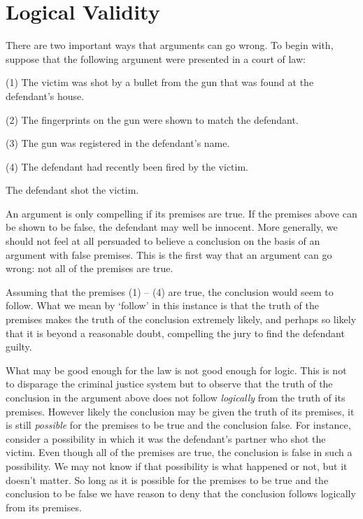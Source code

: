 \section{Logical Validity}

There are two important ways that arguments can go wrong.
To begin with, suppose that the following argument were presented in a court of law:

\begin{earg}
  \item[(1)] The victim was shot by a bullet from the gun that was found at the defendant's house.
  \item[(2)] The fingerprints on the gun were shown to match the defendant.
  \item[(3)] The gun was registered in the defendant's name.
  \item[(4)] The defendant had recently been fired by the victim.
  \item[\therefore] The defendant shot the victim.
\end{earg}

An argument is only compelling if its premises are true.
If the premises above can be shown to be false, the defendant may well be innocent.
More generally, we should not feel at all persuaded to believe a conclusion on the basis of an argument with false premises. 
This is the first way that an argument can go wrong: not all of the premises are true.

Assuming that the premises (1) -- (4) are true, the conclusion would seem to follow.
What we mean by `follow' in this instance is that the truth of the premises makes the truth of the conclusion extremely likely, and perhaps so likely that it is beyond a reasonable doubt, compelling the jury to find the defendant guilty.

What may be good enough for the law is not good enough for logic.
This is not to disparage the criminal justice system but to observe that the truth of the conclusion in the argument above does not follow \textit{logically} from the truth of its premises.
However likely the conclusion may be given the truth of its premises, it is still \textit{possible} for the premises to be true and the conclusion false.
For instance, consider a possibility in which it was the defendant's partner who shot the victim.
Even though all of the premises are true, the conclusion is false in such a possibility.
We may not know if that possibility is what happened or not, but it doesn't matter.
So long as it is possible for the premises to be true and the conclusion to be false we have reason to deny that the conclusion follows logically from its premises.

